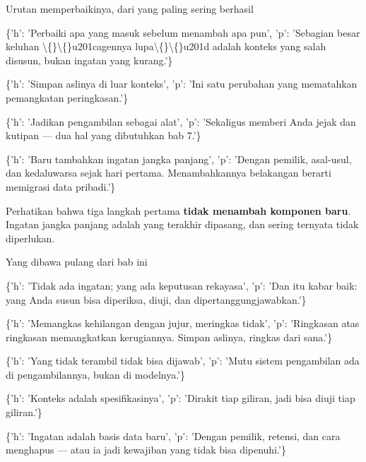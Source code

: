 \documentclass[aspectratio=169,11pt,t]{beamer}
\begin{document}
\begin{frame}[shrink=25]{Urutan memperbaikinya, dari yang paling sering berhasil}
\begin{isteps}
\item \{'h': 'Perbaiki apa yang masuk sebelum menambah apa pun', 'p': 'Sebagian besar keluhan \textbackslash\{\}\textbackslash\{\}u201cagennya lupa\textbackslash\{\}\textbackslash\{\}u201d adalah konteks yang salah disusun, bukan ingatan yang kurang.'\}
\item \{'h': 'Simpan aslinya di luar konteks', 'p': 'Ini satu perubahan yang mematahkan pemangkatan peringkasan.'\}
\item \{'h': 'Jadikan pengambilan sebagai alat', 'p': 'Sekaligus memberi Anda jejak dan kutipan --- dua hal yang dibutuhkan bab 7.'\}
\item \{'h': 'Baru tambahkan ingatan jangka panjang', 'p': 'Dengan pemilik, asal-usul, dan kedaluwarsa sejak hari pertama. Menambahkannya belakangan berarti memigrasi data pribadi.'\}
\end{isteps}
\begin{iband}[signal]
Perhatikan bahwa tiga langkah pertama \textbf{tidak menambah komponen baru}. Ingatan jangka panjang adalah yang terakhir dipasang, dan sering ternyata tidak diperlukan.
\end{iband}
\end{frame}

\begin{frame}[shrink=25]{Yang dibawa pulang dari bab ini}
\begin{isteps}
\item \{'h': 'Tidak ada ingatan; yang ada keputusan rekayasa', 'p': 'Dan itu kabar baik: yang Anda susun bisa diperiksa, diuji, dan dipertanggungjawabkan.'\}
\item \{'h': 'Memangkas kehilangan dengan jujur, meringkas tidak', 'p': 'Ringkasan atas ringkasan memangkatkan kerugiannya. Simpan aslinya, ringkas dari sana.'\}
\item \{'h': 'Yang tidak terambil tidak bisa dijawab', 'p': 'Mutu sistem pengambilan ada di pengambilannya, bukan di modelnya.'\}
\item \{'h': 'Konteks adalah spesifikasinya', 'p': 'Dirakit tiap giliran, jadi bisa diuji tiap giliran.'\}
\item \{'h': 'Ingatan adalah basis data baru', 'p': 'Dengan pemilik, retensi, dan cara menghapus --- atau ia jadi kewajiban yang tidak bisa dipenuhi.'\}
\end{isteps}
\end{frame}
\end{document}
